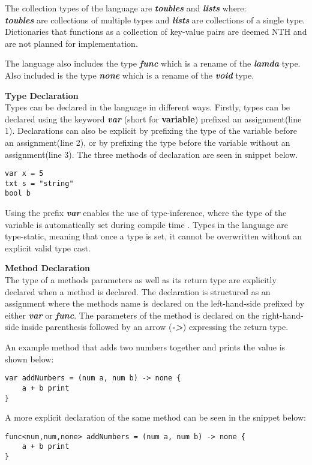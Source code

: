 The collection types of the language are \textbf{\textit{toubles}} and \textbf{\textit{lists}} where:\\
\textbf{\textit{toubles}} are collections of multiple types and \textbf{\textit{lists}} are collections of a single type.
Dictionaries that functions as a collection of key-value pairs are deemed NTH and are not planned for implementation. 

The language also includes the type \textbf{\textit{func}} which is a rename of the \textbf{\textit{lamda}} type.
Also included is the type \textbf{\textit{none}} which is a rename of the \textbf{\textit{void}} type. 

\textbf{Type Declaration}\\
Types can be declared in the language in different ways.
Firstly, types can be declared using the keyword \textbf{\textit{var}} (short for \textbf{variable\textit{}}) prefixed an assignment(line 1).
Declarations can also be explicit by prefixing the type of the variable before an assignment(line 2), or by prefixing the type before the variable without an assignment(line 3).
The three methods of declaration are seen in snippet below.
\begin{lstlisting}
var x = 5
txt s = "string"
bool b
\end{lstlisting}

Using the prefix \textbf{\textit{var}} enables the use of type-inference, where the type of the variable is automatically set during compile time \cite{typeinf}.
Types in the language are type-static, meaning that once a type is set, it cannot be overwritten without an explicit valid type cast.

\textbf{Method Declaration}\\
The type of a methods parameters as well as its return type are explicitly declared when a method is declared. 
The declaration is structured as an assignment where the methods name is declared on the left-hand-side prefixed by either \textbf{\textit{var}} or \textbf{\textit{func}}. 
The parameters of the method is declared on the right-hand-side inside parenthesis followed by an arrow (\textbf{\textit{->}}) expressing the return type. 

An example method that adds two numbers together and prints the value is shown below:
\begin{lstlisting}
var addNumbers = (num a, num b) -> none {
	a + b print
}
\end{lstlisting} 
A more explicit declaration of the same method can be seen in the snippet below:
\begin{lstlisting}
func<num,num,none> addNumbers = (num a, num b) -> none {
	a + b print
}
\end{lstlisting}

